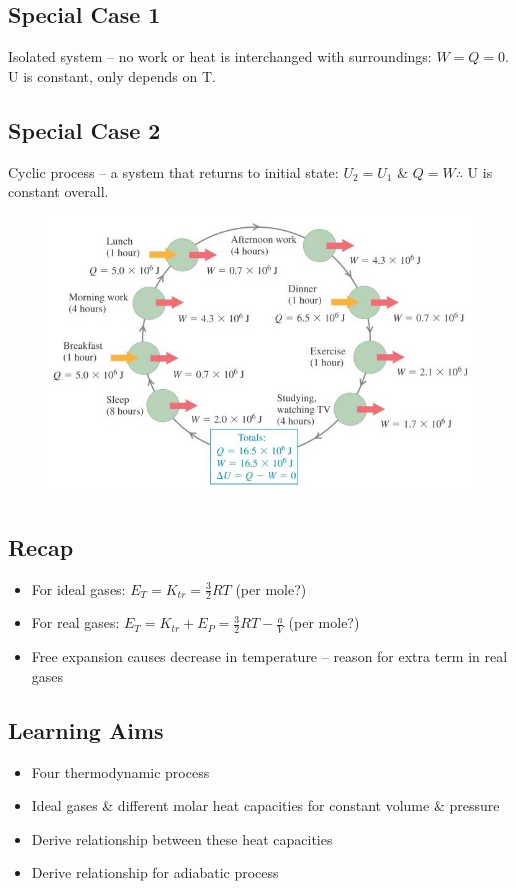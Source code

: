 \documentclass[a4paper, 11pt, normalem]{report}
\begin{document}
\section{Special Case 1}
Isolated system -- no work or heat is interchanged with surroundings: $W = Q = 0$.
U is constant, only depends on T.

\section{Special Case 2}
Cyclic process -- a system that returns to initial state: $U_{2} = U_{1}$ \& $Q = W \therefore$ U is constant overall.
\begin{figure}[H]
    \centering
    \includegraphics[scale=0.9]{Cyclic.jpg}
\end{figure}

\chapter{}
\section{Recap}
\begin{itemize}
    \item For ideal gases: $E_{T} = K_{tr} = \frac{3}{2}RT$ (per mole?)
    \item For real gases: $E_{T} = K_{tr} + E_{P} = \frac{3}{2}RT - \frac{a}{V}$ (per mole?)
    \item Free expansion causes decrease in temperature -- reason for extra term in real gases
\end{itemize}

\section{Learning Aims}
\begin{itemize}
	\item Four thermodynamic process
	\item Ideal gases \&  different molar heat capacities for constant volume \& pressure
	\item Derive relationship between these heat capacities
	\item Derive relationship for adiabatic process
\end{itemize}
\end{document}
